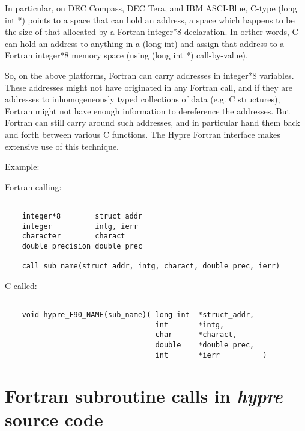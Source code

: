 \vspace{0.1in}


In particular, on DEC Compass, DEC Tera, and IBM ASCI-Blue, C-type
(long int *) points to a space that can hold an address, a space which
happens to be the size of that allocated by a Fortran integer*8 declaration.
In orther words, C can hold an address to anything in a (long int) and
assign that address to a Fortran integer*8 memory space (using (long int *)
call-by-value).

So, on the above platforms, Fortran can carry addresses in integer*8
variables.  These addresses might not have originated in any Fortran call,
and if they are addresses to inhomogeneously typed collections of data
(e.g. C structures), Fortran might not have enough information to dereference
the addresses.  But Fortran can still carry around such addresses, and in
particular hand them back and forth between various C functions.  The Hypre
Fortran interface makes extensive use of this technique.

\vspace{0.2in}

\noindent Example:

\vspace{0.1in}

  Fortran calling:
\begin{verbatim}

    integer*8        struct_addr
    integer          intg, ierr
    character        charact
    double precision double_prec

    call sub_name(struct_addr, intg, charact, double_prec, ierr)

\end{verbatim}
  C called:
\begin{verbatim}

    void hypre_F90_NAME(sub_name)( long int  *struct_addr,
                                   int       *intg,
                                   char      *charact,
                                   double    *double_prec,
                                   int       *ierr          )

\end{verbatim}

\section{Fortran subroutine calls in {\itshape hypre} source code}

\vspace{0.2in}

